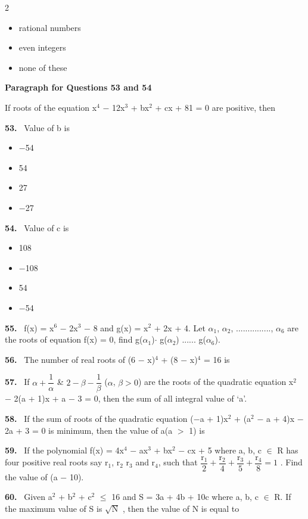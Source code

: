 \documentclass[10pt]{extarticle}
\newcommand{\qn}[1]{\par\smallskip\noindent\textbf{#1.}~}
\newcommand{\paraq}[2]{\par\smallskip\noindent\textbf{Paragraph for Questions #1 and #2}\par}
\newenvironment{qoptions}{\begin{itemize}[leftmargin=1.8em,itemsep=1pt,topsep=2pt,label={}]}{\end{itemize}}
\newcommand{\opt}[2]{\item[(#1)] #2}
\begin{document}
\begin{multicols}{2}
\begin{qoptions}
\opt{B}{rational numbers}
\opt{C}{even integers}
\opt{D}{none of these}
\end{qoptions}
\paraq{53}{54}If roots of the equation x$^4$ $-$ 12x$^3$ + bx$^2$ + cx + 81 = 0 are positive, then
\qn{53} Value of b is
\begin{qoptions}
\opt{A}{$-$54}
\opt{B}{54}
\opt{C}{27}
\opt{D}{$-$27}
\end{qoptions}
\qn{54} Value of c is
\begin{qoptions}
\opt{A}{108}
\opt{B}{$-$108}
\opt{C}{54}
\opt{D}{$-$54}
\end{qoptions}
\qn{55} f(x) = x$^6$ $-$ 2x$^3$ $-$ 8 and g(x) = x$^2$ + 2x + 4. Let $\alpha_1$, $\alpha_2$, ..............., $\alpha_6$ are the roots of equation f(x) = 0, find g($\alpha_1$)$\cdot$ g($\alpha_2$) ...... g($\alpha_6$).
\qn{56} The number of real roots of (6 $-$ x)$^4$ + (8 $-$ x)$^4$ = 16 is
\qn{57} If $\alpha+\dfrac1\alpha$ \& $2-\beta-\dfrac1\beta$ ($\alpha$, $\beta>0$) are the roots of the quadratic equation x$^2$ $-$ 2(a + 1)x + a $-$ 3 = 0, then the sum of all integral value of `a'.
\qn{58} If the sum of roots of the quadratic equation ($-$a + 1)x$^2$ + (a$^2$ $-$ a + 4)x $-$ 2a + 3 = 0 is minimum, then the value of a(a $>$ 1) is
\qn{59} If the polynomial f(x) = 4x$^4$ $-$ ax$^3$ + bx$^2$ $-$ cx + 5 where a, b, c $\in$ R has four positive real roots say r$_1$, r$_2$ r$_3$ and r$_4$, such that $\dfrac{\mathrm r_1}2+\dfrac{\mathrm r_2}4+\dfrac{\mathrm r_3}5+\dfrac{\mathrm r_4}8=1$ . Find the value of (a $-$ 10).
\qn{60} Given a$^2$ + b$^2$ + c$^2$ $\leq$ 16 and S = 3a + 4b + 10c where a, b, c $\in$ R. If the maximum value of S is $\sqrt{\mathrm N}$ , then the value of N is equal to
\end{multicols}
\end{document}
